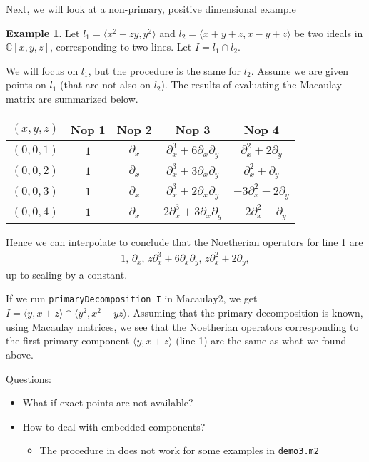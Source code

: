 \documentclass[letterpaper]{article}
\theoremstyle{plain}
\theoremstyle{definition}
\newtheorem{example}[theorem]{Example}
\theoremstyle{remark}
\begin{document}
Next, we will look at a non-primary, positive dimensional example
\begin{example}\label{ex:non-primary-numerical-prim-dec}
	Let $l_1 = \langle x^2 - zy, y^2 \rangle$ and $l_2 = \langle x+y+z, x-y+z \rangle$ be two ideals in $\mathbb{C}[x,y,z]$, corresponding to two lines. Let $I = l_1 \cap l_2$.

	We will focus on $l_1$, but the procedure is the same for $l_2$. Assume we are given points on $l_1$ (that are not also on $l_2$). The results of evaluating the Macaulay matrix are summarized below.
	\begin{table}[h!]
	\centering
	\begin{tabular}{ccccc}
	\toprule
	$(x,y,z)$ &  Nop 1 & Nop 2 & Nop 3 & Nop 4\\
	\midrule
	$(0,0,1)$ & $1$ & $\partial_x$ & $\partial_x^3 + 6 \partial_x \partial_y$ & $\partial_x^2 + 2 \partial_y$\\
	$(0,0,2)$ & $1$ & $\partial_x$ & $\partial_x^3 + 3 \partial_x \partial_y$ & $\partial_x^2 + \partial_y$\\
	$(0,0,3)$ & $1$ & $\partial_x$ & $\partial_x^3 + 2 \partial_x \partial_y$ & $-3\partial_x^2 -2 \partial_y$\\
	$(0,0,4)$ & $1$ & $\partial_x$ & $2\partial_x^3 + 3 \partial_x \partial_y$ & $-2\partial_x^2 - \partial_y$\\
	\bottomrule
	\end{tabular}
	\end{table}
	Hence we can interpolate to conclude that the Noetherian operators for line 1 are
	\begin{align*}
		1,\, \partial_x,\,z \partial_x^{3}+6 \partial_x \partial_y,\,z \partial_x^{2}+2 \partial_y,
	\end{align*}
	up to scaling by a constant.

	If we run \texttt{primaryDecomposition I} in Macaulay2, we get $I = \langle y,x+z \rangle \cap \langle y^2, x^2 - yz \rangle$. Assuming that the primary decomposition is known, using Macaulay matrices, we see that the Noetherian operators corresponding to the first primary component $\langle y,x+z \rangle$ (line 1) are the same as what we found above.
\end{example}

Questions:
\begin{itemize}
	\item What if exact points are not available?
	\item How to deal with embedded components?
	\begin{itemize}
		\item The procedure in  does not work for some examples in \texttt{demo3.m2}
	\end{itemize}
\end{itemize}
\end{document}
